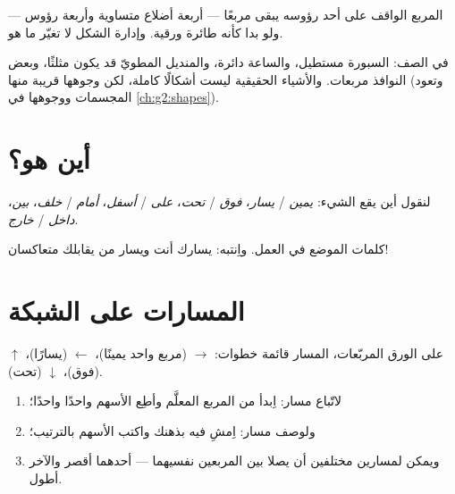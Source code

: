 \begin{example}\label{ex:g1:shapes:tilted}
المربع الواقف على أحد رؤوسه يبقى مربعًا --- أربعة أضلاع متساوية
وأربعة رؤوس --- ولو بدا كأنه طائرة ورقية. وإدارة الشكل لا تغيّر ما
هو.
\end{example}

\begin{example}\label{ex:g1:shapes:hunt}
في الصف: السبورة مستطيل، والساعة دائرة، والمنديل المطويّ قد يكون
مثلثًا، وبعض النوافذ مربعات. والأشياء الحقيقية ليست أشكالًا كاملة،
لكن وجوهها قريبة منها (وتعود المجسمات ووجوهها في
\cref{ch:g2:shapes}).
\end{example}

\section{أين هو؟}

\begin{definition}\label{def:g1:shapes:position}
لنقول أين يقع الشيء: \emph{يمين} / \emph{يسار}،
\emph{فوق} / \emph{تحت}، \emph{على} / \emph{أسفل}،
\emph{أمام} / \emph{خلف}، \emph{بين}،
\emph{داخل} / \emph{خارج}.
\end{definition}

\begin{omfigure}

{\small كلمات الموضع في العمل. واِنتبه: يسارك أنت ويسار من
يقابلك متعاكسان!}
\end{omfigure}

\section{المسارات على الشبكة}

\begin{method}\label{met:g1:shapes:path}
على الورق المربّعات، المسار قائمة خطوات:
$\to$ (مربع واحد يمينًا)، $\leftarrow$ (يسارًا)، $\uparrow$ (فوق)،
$\downarrow$ (تحت).
\begin{enumerate}
  \item لاتّباع مسار: اِبدأ من المربع المعلَّم وأطِع الأسهم واحدًا
        واحدًا؛
  \item ولوصف مسار: اِمشِ فيه بذهنك واكتب الأسهم بالترتيب؛
  \item ويمكن لمسارين مختلفين أن يصلا بين المربعين نفسيهما ---
        أحدهما أقصر والآخر أطول.
\end{enumerate}
\end{method}

